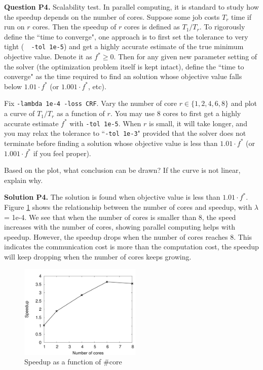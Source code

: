 \documentclass[11pt]{report}
\begin{document}
{\bf Question P4.}
Scalability test.
In parallel computing, it is standard to study how the speedup depends on the number of cores.
Suppose some job costs $T_r$ time if run on $r$ cores.
Then the speedup of $r$ cores is defined as $T_1 / T_r$.
To rigorously define the ``time to converge",
one approach is to first set the tolerance to very tight (\eg\ \verb! -tol 1e-5!)
and get a highly accurate estimate of the true minimum objective value.
Denote it as $f^* \ge 0$.
Then for any given new parameter setting of the solver (the optimization problem itself is kept intact), define the ``time to converge" as the time required to find an solution whose objective value falls below $1.01 \cdot f^*$ (or  $1.001 \cdot f^*$, etc).

Fix \verb!-lambda 1e-4 -loss CRF!.
Vary the number of core $r \in \{1, 2, 4, 6, 8\}$ and plot a curve of $T_1 / T_r$ as a function of $r$.
You may use 8 cores to first get a highly accurate estimate $f^*$ with \verb!-tol 1e-5!.
When $r$ is small, it will take longer, and you may relax the tolerance to ``\verb!-tol 1e-3!" provided that the solver does not terminate before finding a solution whose objective value is less than $1.01 \cdot f^*$ (or $1.001 \cdot f^*$ if you feel proper).

Based on the plot, what conclusion can be drawn?
If the curve is not linear, explain why.

{\bf Solution P4.}
The solution is found when objective value is less than $1.01 \cdot f^*$. Figure \ref{fig:scalability} shows the relationship between the number of cores and speedup, with $\lambda$ = {\sf 1e-4}. We see that when the number of cores is smaller than 8, the speed increases with the number of cores, showing parallel computing helps with speedup. However, the speedup drops when the number of cores reaches 8. This indicates the communication cost is more than the computation cost, the speedup will keep dropping when the number of cores keeps growing. 

\begin{figure}[htbp!]
\centering
\includegraphics[width=5.8cm]{p4_scalability}
\caption{Speedup as a function of \#core}
\label{fig:scalability}
\end{figure}
\end{document}
